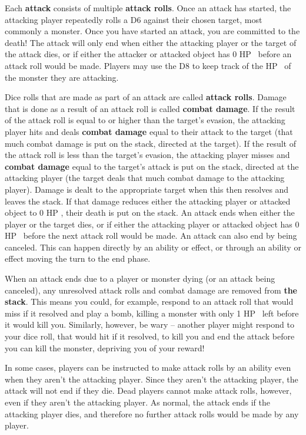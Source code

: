 \documentclass[
  fontsize=10pt,
  paper=a5,
  version=last,
  chapterprefix=true,
  bindingoffset=5mm,
  ]{scrbook}
\newcommand*{\inlineicon}[1]{%
    \raisebox{-.3\baselineskip}{%
        \smash{%
            \texttt{[image: \#1]}%
        }%
    }%
}
\newcommand{\heart}{\inlineicon{./assets/ms-heart.png}}
\begin{document}
    Each \textbf{attack} consists of multiple \textbf{attack rolls}. Once an attack has started, the attacking player repeatedly rolls a D6 against their chosen target, most commonly a monster. Once you have started an attack, you are committed to the death! The attack will only end when either the attacking player or the target of the attack dies, or if either the attacker or attacked object has 0 HP\heart\ before an attack roll would be made. Players may use the D8 to keep track of the HP\heart\ of the monster they are attacking.

    Dice rolls that are made as part of an attack are called \textbf{attack rolls}. Damage that is done as a result of an attack roll is called \textbf{combat damage}. If the result of the attack roll is equal to or higher than the target’s evasion, the attacking player hits and deals \textbf{combat damage} equal to their attack to the target (that much combat damage is put on the stack, directed at the target). If the result of the attack roll is less than the target’s evasion, the attacking player misses and \textbf{combat damage} equal to the target’s attack is put on the stack, directed at the attacking player (the target deals that much combat damage to the attacking player). Damage is dealt to the appropriate target when this then resolves and leaves the stack. If that damage reduces either the attacking player or attacked object to 0 HP\heart, their death is put on the stack. An attack ends when either the player or the target dies, or if either the attacking player or attacked object has 0 HP\heart\ before the next attack roll would be made. An attack can also end by being canceled. This can happen directly by an ability or effect, or through an ability or effect moving the turn to the end phase.

    When an attack ends due to a player or monster dying (or an attack being canceled), any unresolved attack rolls and combat damage are removed from \textbf{the stack}. This means you could, for example, respond to an attack roll that would miss if it resolved and play a bomb, killing a monster with only 1 HP\heart\ left before it would kill you. Similarly, however, be wary – another player might respond to your dice roll, that would hit if it resolved, to kill you and end the attack before you can kill the monster, depriving you of your reward!

    In some cases, players can be instructed to make attack rolls by an ability even when they aren’t the attacking player. Since they aren’t the attacking player, the attack will not end if they die. Dead players cannot make attack rolls, however, even if they aren’t the attacking player. As normal, the attack ends if the attacking player dies, and therefore no further attack rolls would be made by any player.
\end{document}
